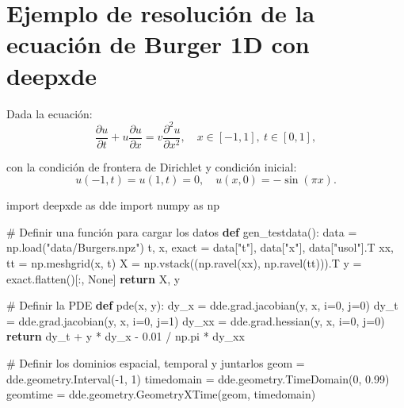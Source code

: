 \documentclass[
  spanish,
  us-letterpaper,
]{scrreprt}
\newenvironment{Shaded}{\begin{snugshade}}{\end{snugshade}}
\newcommand{\CommentTok}[1]{\textcolor[rgb]{0.37,0.37,0.37}{#1}}
\newcommand{\ControlFlowTok}[1]{\textcolor[rgb]{0.00,0.23,0.31}{\textbf{#1}}}
\newcommand{\DecValTok}[1]{\textcolor[rgb]{0.68,0.00,0.00}{#1}}
\newcommand{\FloatTok}[1]{\textcolor[rgb]{0.68,0.00,0.00}{#1}}
\newcommand{\ImportTok}[1]{\textcolor[rgb]{0.00,0.46,0.62}{#1}}
\newcommand{\KeywordTok}[1]{\textcolor[rgb]{0.00,0.23,0.31}{\textbf{#1}}}
\newcommand{\NormalTok}[1]{\textcolor[rgb]{0.00,0.23,0.31}{#1}}
\newcommand{\OperatorTok}[1]{\textcolor[rgb]{0.37,0.37,0.37}{#1}}
\newcommand{\StringTok}[1]{\textcolor[rgb]{0.13,0.47,0.30}{#1}}
\newcommand{\VariableTok}[1]{\textcolor[rgb]{0.07,0.07,0.07}{#1}}
\theoremstyle{definition}
\theoremstyle{plain}
\theoremstyle{remark}
\begin{document}
\section{Ejemplo de resolución de la ecuación de Burger 1D con
deepxde}\label{ejemplo-de-resoluciuxf3n-de-la-ecuaciuxf3n-de-burger-1d-con-deepxde}

Dada la ecuación: \[
\dfrac{\partial u}{\partial t} + u\dfrac{\partial u}{\partial x} = v\dfrac{\partial^2 u}{\partial x^2}, \quad x \in[-1,1], \ t\in[0,1],
\]

con la condición de frontera de Dirichlet y condición inicial: \[
u(-1,t) = u(1,t) = 0, \quad u(x,0)=-\sin(\pi x).
\]

\begin{Shaded}
\begin{Highlighting}[]
\ImportTok{import}\NormalTok{ deepxde }\ImportTok{as}\NormalTok{ dde}
\ImportTok{import}\NormalTok{ numpy }\ImportTok{as}\NormalTok{ np}

\CommentTok{\# Definir una función para cargar los datos}
\KeywordTok{def}\NormalTok{ gen\_testdata():}
\NormalTok{    data }\OperatorTok{=}\NormalTok{ np.load(}\StringTok{"data/Burgers.npz"}\NormalTok{)}
\NormalTok{    t, x, exact }\OperatorTok{=}\NormalTok{ data[}\StringTok{"t"}\NormalTok{], data[}\StringTok{"x"}\NormalTok{], data[}\StringTok{"usol"}\NormalTok{].T}
\NormalTok{    xx, tt }\OperatorTok{=}\NormalTok{ np.meshgrid(x, t)}
\NormalTok{    X }\OperatorTok{=}\NormalTok{ np.vstack((np.ravel(xx), np.ravel(tt))).T}
\NormalTok{    y }\OperatorTok{=}\NormalTok{ exact.flatten()[:, }\VariableTok{None}\NormalTok{]}
    \ControlFlowTok{return}\NormalTok{ X, y}

\CommentTok{\# Definir la PDE}
\KeywordTok{def}\NormalTok{ pde(x, y):}
\NormalTok{    dy\_x }\OperatorTok{=}\NormalTok{ dde.grad.jacobian(y, x, i}\OperatorTok{=}\DecValTok{0}\NormalTok{, j}\OperatorTok{=}\DecValTok{0}\NormalTok{)}
\NormalTok{    dy\_t }\OperatorTok{=}\NormalTok{ dde.grad.jacobian(y, x, i}\OperatorTok{=}\DecValTok{0}\NormalTok{, j}\OperatorTok{=}\DecValTok{1}\NormalTok{)}
\NormalTok{    dy\_xx }\OperatorTok{=}\NormalTok{ dde.grad.hessian(y, x, i}\OperatorTok{=}\DecValTok{0}\NormalTok{, j}\OperatorTok{=}\DecValTok{0}\NormalTok{)}
    \ControlFlowTok{return}\NormalTok{ dy\_t }\OperatorTok{+}\NormalTok{ y }\OperatorTok{*}\NormalTok{ dy\_x }\OperatorTok{{-}} \FloatTok{0.01} \OperatorTok{/}\NormalTok{ np.pi }\OperatorTok{*}\NormalTok{ dy\_xx}

\CommentTok{\# Definir los dominios espacial, temporal y juntarlos}
\NormalTok{geom }\OperatorTok{=}\NormalTok{ dde.geometry.Interval(}\OperatorTok{{-}}\DecValTok{1}\NormalTok{, }\DecValTok{1}\NormalTok{)}
\NormalTok{timedomain }\OperatorTok{=}\NormalTok{ dde.geometry.TimeDomain(}\DecValTok{0}\NormalTok{, }\FloatTok{0.99}\NormalTok{)}
\NormalTok{geomtime }\OperatorTok{=}\NormalTok{ dde.geometry.GeometryXTime(geom, timedomain)}


\end{Highlighting}
\end{Shaded}
\end{document}
